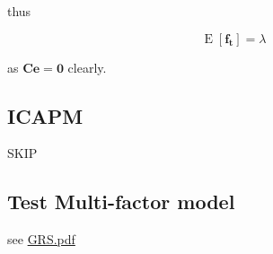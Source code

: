 \documentclass{article}
\begin{document}
thus

\[ \mathop{\text{E}}[\bm{\mathbf{f_t}}]=\lambda \]

as \(\bm{\mathbf{Ce=0}}\) clearly.

\hypertarget{icapm}{%
\subsection{ICAPM}\label{icapm}}

SKIP

\hypertarget{test-multi-factor-model}{%
\subsection{Test Multi-factor model}\label{test-multi-factor-model}}

see \url{GRS.pdf}

\newpage



\end{document}
